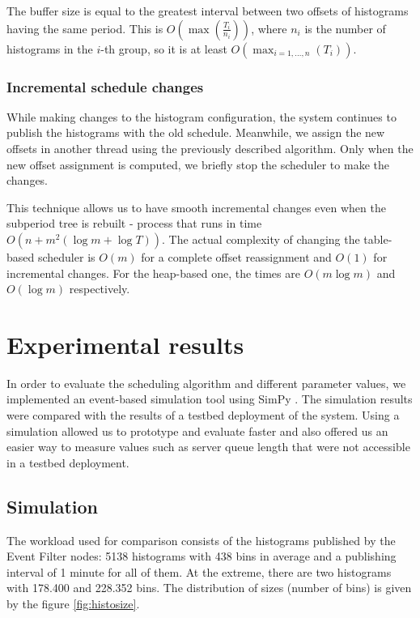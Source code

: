 The buffer size is equal to the greatest interval between two offsets of histograms having the same period. This is  $O\left(\max\left(\frac {T_i}  {n_i}\right)\right)$, where $n_i$ is the number of histograms in the $i$-th group, so it is at least $O(\max_{i=1,\ldots,n}(T_i))$.

\subsubsection*{Incremental schedule changes}

While making changes to the histogram configuration, the system continues to publish the histograms with the old schedule. Meanwhile, we assign the new offsets in another thread using the previously described algorithm. Only when the new offset assignment is computed, we briefly stop the scheduler to make the changes.

This technique allows us to have smooth incremental changes even when the subperiod tree is rebuilt - process that runs in time $O(n+m^2(\log m+\log T))$. The actual complexity of changing the table-based scheduler is $O(m)$ for a complete offset reassignment and $O(1)$ for incremental changes. For the heap-based one, the times are $O(m\log m)$ and $O(\log m)$ respectively.






\section{Experimental results}

In order to evaluate the scheduling algorithm and different parameter values, we implemented an event-based simulation tool using SimPy \citep{simpy}. The simulation results were compared with the results of a testbed deployment of the system. Using a simulation allowed us to prototype and evaluate faster and also offered us an easier way to measure values such as server queue length that were not accessible in a testbed deployment.

\subsection{Simulation}

The workload used for comparison consists of the histograms published by the Event Filter nodes: 5138 histograms with 438 bins in average and a publishing interval of 1 minute for all of them. At the extreme, there are two histograms with 178.400 and 228.352 bins. The distribution of sizes (number of bins) is given by the figure \ref{fig:histosize}.

